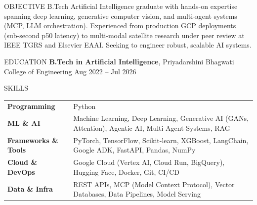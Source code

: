 \documentclass[letterpaper]{resume}
\begin{document}
\fontsize{9.8}{11.8}\selectfont


\begin{rSection}{OBJECTIVE}
B.Tech Artificial Intelligence graduate with hands-on expertise spanning deep learning, generative computer vision, and multi-agent systems (MCP, LLM orchestration). Experienced from production GCP deployments (sub-second p50 latency) to multi-modal satellite research under peer review at IEEE TGRS and Elsevier EAAI. Seeking to engineer robust, scalable AI systems.
\end{rSection}


\begin{rSection}{EDUCATION}
{\bf B.Tech in Artificial Intelligence}, Priyadarshini Bhagwati College of Engineering \hfill Aug 2022 -- Jul 2026
\end{rSection}


\begin{rSection}{SKILLS}
\begin{tabular}{ @{} >{\bfseries}l @{\hspace{3.5ex}} p{} }
Programming         & Python \\
ML \& AI            & Machine Learning, Deep Learning, Generative AI (GANs, Attention), Agentic AI, Multi-Agent Systems, RAG \\
Frameworks \& Tools & PyTorch, TensorFlow, Scikit-learn, XGBoost, LangChain, Google ADK, FastAPI, Pandas, NumPy \\
Cloud \& DevOps     & Google Cloud (Vertex AI, Cloud Run, BigQuery), Hugging Face, Docker, Git, CI/CD \\
Data \& Infra       & REST APIs, MCP (Model Context Protocol), Vector Databases, Data Pipelines, Model Serving \\
\end{tabular}
\end{rSection}
\end{document}
